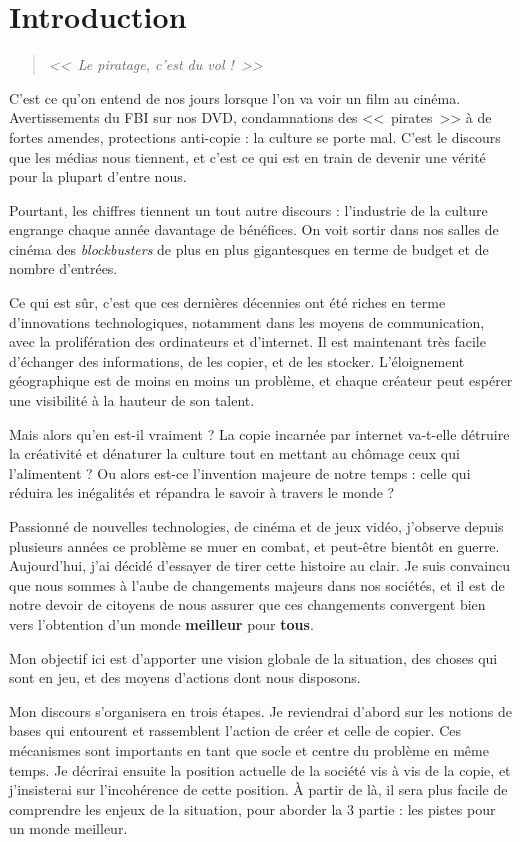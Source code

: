 \chapter*{Introduction}

\begin{quote}
{\Large \textit{<<~Le piratage, c'est du vol !~>>}}
\end{quote}

C'est ce qu'on entend de nos jours lorsque l'on va voir un film au cinéma. Avertissements du FBI sur nos DVD, condamnations des <<~pirates~>> à de fortes amendes, protections anti-copie : la culture se porte mal. C'est le discours que les médias nous tiennent, et c'est ce qui est en train de devenir une vérité pour la plupart d'entre nous.

Pourtant, les chiffres tiennent un tout autre discours : l'industrie de la culture engrange chaque année davantage de bénéfices. On voit sortir dans nos salles de cinéma des \textit{blockbusters} de plus en plus gigantesques en terme de budget et de nombre d'entrées.

Ce qui est sûr, c'est que ces dernières décennies ont été riches en terme d'innovations technologiques, notamment dans les moyens de communication, avec la prolifération des ordinateurs et d'internet. Il est maintenant très facile d'échanger des informations, de les copier, et de les stocker. L'éloignement géographique est de moins en moins un problème, et chaque créateur peut espérer une visibilité à la hauteur de son talent.

Mais alors qu'en est-il vraiment ? La copie incarnée par internet va-t-elle détruire la créativité et dénaturer la culture tout en mettant au chômage ceux qui l'alimentent ? Ou alors est-ce l'invention majeure de notre temps : celle qui réduira les inégalités et répandra le savoir à travers le monde ?

Passionné de nouvelles technologies, de cinéma et de jeux vidéo, j'observe depuis plusieurs années ce problème se muer en combat, et peut-être bientôt en guerre. Aujourd'hui, j'ai décidé d'essayer de tirer cette histoire au clair. Je suis convaincu que nous sommes à l'aube de changements majeurs dans nos sociétés, et il est de notre devoir de citoyens de nous assurer que ces changements convergent bien vers l'obtention d'un monde \textbf{meilleur} pour \textbf{tous}.

Mon objectif ici est d'apporter une vision globale de la situation, des choses qui sont en jeu, et des moyens d'actions dont nous disposons.

Mon discours s'organisera en trois étapes. Je reviendrai d'abord sur les notions de bases qui entourent et rassemblent l'action de créer et celle de copier. Ces mécanismes sont importants en tant que socle et centre du problème en même temps. Je décrirai ensuite la position actuelle de la société vis à vis de la copie, et j'insisterai sur l'incohérence de cette position. À partir de là, il sera plus facile de comprendre les enjeux de la situation, pour aborder la 3\ieme{} partie : les pistes pour un monde meilleur.
